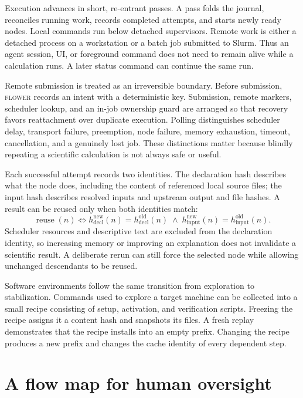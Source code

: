 \documentclass[10pt]{article}
\newcommand{\flower}{\textsc{flower}}
\begin{document}
Execution advances in short, re-entrant passes. A pass folds the journal, reconciles running work, records
completed attempts, and starts newly ready nodes. Local commands run below detached supervisors. Remote work
is either a detached process on a workstation or a batch job submitted to Slurm. Thus an agent session, UI,
or foreground command does not need to remain alive while a calculation runs. A later status command can
continue the same run.

Remote submission is treated as an irreversible boundary. Before submission, \flower{} records an intent with
a deterministic key. Submission, remote markers, scheduler lookup, and an in-job ownership guard are arranged
so that recovery favors reattachment over duplicate execution. Polling distinguishes scheduler delay,
transport failure, preemption, node failure, memory exhaustion, timeout, cancellation, and a genuinely lost
job. These distinctions matter because blindly repeating a scientific calculation is not always safe or
useful.

Each successful attempt records two identities. The declaration hash describes what the node does, including
the content of referenced local source files; the input hash describes resolved inputs and upstream output
and file hashes. A result can be reused only when both identities match:
\[
  \operatorname{reuse}(n) \iff
  h_{\mathrm{decl}}^{\mathrm{new}}(n)=h_{\mathrm{decl}}^{\mathrm{old}}(n)
  \;\land\;
  h_{\mathrm{input}}^{\mathrm{new}}(n)=h_{\mathrm{input}}^{\mathrm{old}}(n).
\]
Scheduler resources and descriptive text are excluded from the declaration identity, so increasing memory or
improving an explanation does not invalidate a scientific result. A deliberate rerun can still force the
selected node while allowing unchanged descendants to be reused.

Software environments follow the same transition from exploration to stabilization. Commands used to explore
a target machine can be collected into a small recipe consisting of setup, activation, and verification
scripts. Freezing the recipe assigns it a content hash and snapshots its files. A fresh replay demonstrates
that the recipe installs into an empty prefix. Changing the recipe produces a new prefix and changes the cache
identity of every dependent step.

\section{A flow map for human oversight}
\end{document}
